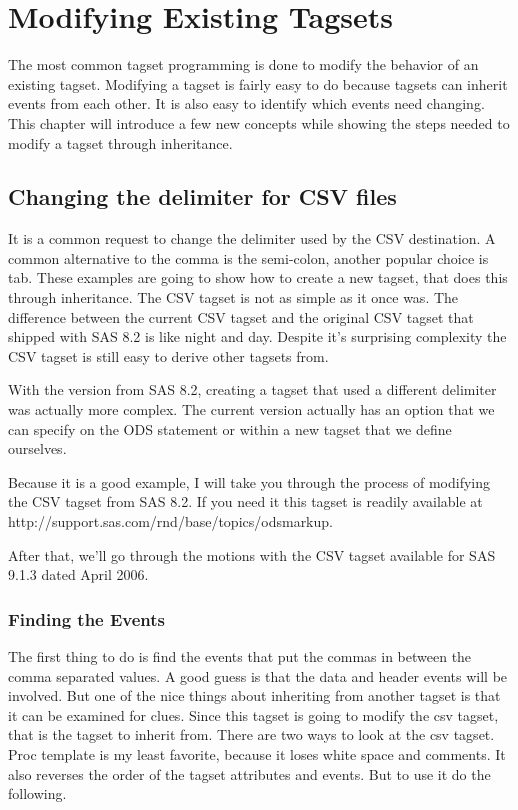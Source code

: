 \chapter{Modifying Existing Tagsets}
The most common tagset programming is done to
modify the behavior of an existing tagset. 
Modifying a tagset is fairly easy to do because
tagsets can inherit events from each other.  
It is also easy to identify which events need changing.
This chapter will introduce a few new concepts
while showing the steps needed to modify a tagset
through inheritance.  
 

\section{Changing the delimiter for CSV files}

It is a common request to change the delimiter used
by the CSV destination.
A common alternative to the comma is the semi-colon, another
popular choice is tab. These examples are going to
show how to create a new tagset, that does this
through inheritance.  The CSV tagset is not as simple
as it once was.  The difference between the current CSV
tagset and the original CSV tagset that shipped with SAS 8.2
is like night and day.  Despite it's surprising complexity
the CSV tagset is still easy to derive other tagsets from.

With the version from SAS 8.2, creating a tagset that used
a different delimiter was actually more complex.  The current
version actually has an option that we can specify on the 
ODS statement or within a new tagset that we define ourselves.

Because it is a good example, I will take you through the process
of modifying the CSV tagset from SAS 8.2.  If you need it this
tagset is readily available at http://support.sas.com/rnd/base/topics/odsmarkup.

After that, we'll go through the motions with the CSV tagset available
for SAS 9.1.3 dated April 2006.


\subsection{Finding the Events}
The first thing to do is find the events that
put the commas in between the comma separated values.
A good guess is that the data and header events will
be involved.  But one of the nice things about inheriting
from another tagset is that it can be examined for clues.
Since this tagset is going to modify the csv tagset, that
is the tagset to inherit from.
There are two ways to look at the csv
tagset.  Proc template is my least favorite, because
it loses white space and comments.  It also reverses
the order of the tagset attributes and events.  But
to use it do the following.

